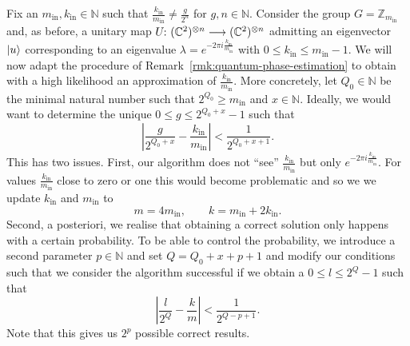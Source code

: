 \documentclass[a4paper, oneside, 12pt]{amsart}
\begin{document}
\begin{remark}\label{rmk:quantum-phase-with-errors}
  Fix an  \(m_{\mathrm{in}}, k_{\mathrm{in}} \in \mathbb{N}\) such that \(\tfrac{k_{\mathrm{in}}}{m_{\mathrm{in}}} \neq \tfrac{g}{2^{n}}\) for \(g, n\in \mathbb{N}\).
  Consider the group \(G= \mathbb{Z}_{m_{\mathrm{in}}}\) and, as before, a unitary map \(U\from ( \mathbb{C}^{2})^{\otimes n} \to ( \mathbb{C}^{2})^{\otimes n}\) admitting an eigenvector \(\lvert u\rangle\) corresponding to an eigenvalue \( \lambda = e^{-2\pi i \tfrac{k_{\mathrm{in}}}{m_{\mathrm{in}}}}\) with \(0 \leq k_{\mathrm{in}} \leq m_{\mathrm{in}}-1\).
  We will now adapt the procedure of Remark~\ref{rmk:quantum-phase-estimation} to obtain with a high likelihood an approximation of \(\tfrac{k_{\mathrm{in}}}{m_{\mathrm{in}}}\).
  More concretely, let \(Q_{0}\in \mathbb{N}\) be the  minimal natural number such that \(2^{Q_{0}}\geq m_{\mathrm{in}}\) and \(x \in \mathbb{N}\).
  Ideally, we would want to determine the unique \(0 \leq g\leq 2^{Q_{0}+ x}-1\) such that
  \begin{equation*}
    \left|\frac{g}{2^{Q_{0}+x}}-\frac{k_{\mathrm{in}}}{m_{\mathrm{in}}} \right| < \frac{1}{2^{Q_{0}+x+1}}.
  \end{equation*}
  This has two issues.
  First, our algorithm does not ``see'' \(\tfrac{k_{\mathrm{in}}}{m_{\mathrm{in}}}\) but only \(e^{-2\pi i \tfrac{k_{\mathrm{in}}}{m_{\mathrm{in}}}}\).
  For values \(\tfrac{k_{\mathrm{in}}}{m_{\mathrm{in}}}\) close to zero or one this would become problematic and so we  we update \(k_{\mathrm{in}}\) and \(m_{\mathrm{in}}\) to
  \begin{equation*}
    m = 4m_{\mathrm{in}}, \qquad
    k = m_{\mathrm{in}} + 2k_{\mathrm{in}}.
  \end{equation*}
  Second, a posteriori, we realise that obtaining a correct solution only happens with a certain probability.
  To be able to control the probability, we introduce a second parameter \(p\in \mathbb{N}\) and set \(Q = Q_{0}+x+p+1\) and modify our conditions such that we consider the algorithm successful if we obtain a \(0\leq l \leq 2^{Q}-1\) such that
  \begin{equation*}
    \left|\frac{l}{2^{Q}}-\frac{k}{m}\right| < \frac{1}{2^{Q-p+1}}.
  \end{equation*}
  Note that this gives us \(2^{p}\) possible correct results.


\end{remark}
\end{document}
